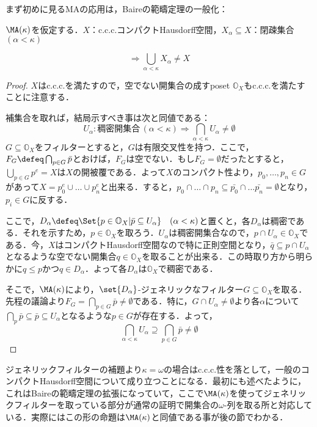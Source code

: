 \documentclass[a4j]{ltjsarticle}
\theoremstyle{definition}
\begin{document}
まず初めに見るMAの応用は，Baireの範疇定理の一般化：
\begin{lemma}
 $\MA(\kappa)$を仮定する．$X$：c.c.c.コンパクトHausdorff空間，$X_\alpha \subseteq X$：閉疎集合$(\alpha < \kappa)$

  \[
    \Longrightarrow \bigcup_{\alpha < \kappa} X_\alpha \neq X 
  \]
\end{lemma}
\begin{proof}
 $X$はc.c.c.を満たすので，空でない開集合の成すposet $\mathbb{O}_X$もc.c.c.を満たすことに注意する．

 補集合を取れば，結局示すべき事は次と同値である：
 \[
  U_\alpha : \text{稠密開集合}\, (\alpha < \kappa) \Rightarrow \bigcap_{\alpha < \kappa} U_\alpha \neq \emptyset
 \]
 $G \subseteq \mathbb{O}_X$をフィルターとすると，$G$は有限交叉性を持つ．ここで，$F_G \defeq \bigcap_{p \in G} \bar{p}$とおけば，$F_G$は空でない．もし$F_G = \emptyset$だったとすると，$\bigcup_{p \in G} p^e = X$は$X$の開被覆である．よって$X$のコンパクト性より，$p_0, \dots, p_n \in G$があって$X = p_0^e \cup \dots \cup p_n^e$と出来る．すると，$p_0 \cap \dots \cap p_n \subseteq \bar{p_0} \cap \dots \bar{p_n} = \emptyset$となり，$p_i \in G$に反する．

 ここで，$D_\alpha \defeq \Set{ p \in \mathbb{O}_X | \bar{p} \subseteq U_\alpha } \quad (\alpha < \kappa)$と置くと，各$D_\alpha$は稠密である．それを示すため，$p \in \mathbb{O}_X$を取ろう．$U_\alpha$は稠密開集合なので，$p \cap U_\alpha \in \mathbb{O}_X$である．今，$X$はコンパクトHausdorff空間なので特に正則空間となり，$\bar{q} \subseteq p \cap U_\alpha$となるような空でない開集合$q \in \mathbb{O}_X$を取ることが出来る．この時取り方から明らかに$q \leq p$かつ$q \in D_\alpha$．よって各$D_\alpha$は$\mathbb{O}_X$で稠密である．

 そこで，$\MA(\kappa)$により，$\set{D_\alpha}$-ジェネリックなフィルター$G \subseteq \mathbb{O}_X$を取る．先程の議論より$F_G = \bigcap_{p \in G} \bar{p} \neq \emptyset$である．特に，$G \cap U_\alpha \neq \emptyset$より各$\alpha$について$\bigcap_p \bar{p} \subseteq \bar{p} \subseteq U_\alpha$となるような$p \in G$が存在する．よって，
 \[
  \bigcap_{\alpha < \kappa} U_\alpha \supseteq \bigcap_{p \in G} \bar{p} \neq \emptyset
 \]
 \mbox{}
\end{proof}

ジェネリックフィルターの補題より$\kappa = \omega$の場合はc.c.c.性を落として，一般のコンパクトHausdorff空間について成り立つことになる．最初にも述べたように，これはBaireの範疇定理の拡張になっていて，ここで$\MA(\kappa)$を使ってジェネリックフィルターを取っている部分が通常の証明で開集合の$\omega$-列を取る所と対応している．実際にはこの形の命題は$\MA(\kappa)$と同値である事が後の節でわかる．
\end{document}
